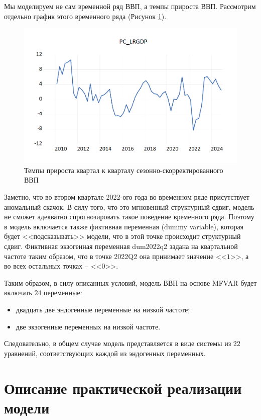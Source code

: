 \documentclass[a4paper, 14pt]{extreport}
\numberwithin{equation}{section}
\numberwithin{equation}{section}
\begin{document}
	Мы моделируем не сам временной ряд ВВП, а темпы прироста ВВП. Рассмотрим отдельно график этого временного ряда (Рисунок \ref{fig:image42}).
	\begin{figure}[h!]
		\centering
		\includegraphics[scale=0.7]{images/image42}
		\caption{Темпы прироста квартал к кварталу сезонно-скорректированного ВВП}
		\label{fig:image42}
	\end{figure}
	Заметно, что во втором квартале 2022-ого года во временном ряде присутствует аномальный скачок. В силу того, что это мгновенный структурный сдвиг, модель не сможет адекватно спрогнозировать такое поведение временного ряда. Поэтому в модель включается также фиктивная переменная (dummy variable), которая будет <<подсказывать>> модели, что в этой точке происходит структурный сдвиг. Фиктивная экзогенная переменная dum2022q2 задана на квартальной частоте таким образом, что в точке 2022Q2 она принимает значение <<$1$>>, а во всех остальных точках -- <<$0$>>.
	
	Таким образом, в силу описанных условий, модель ВВП на основе MFVAR будет включать $24$ переменные:
	\begin{itemize}
		\item двадцать две эндогенные переменные на низкой частоте;
		\item две экзогенные переменных на низкой частоте.
	\end{itemize}
	Следовательно, в общем случае модель представляется в виде системы из $22$ уравнений, соответствующих каждой из эндогенных переменных.
	
	\section{Описание практической реализации модели}
	\label{sec:pract-realise}
	
\end{document}
